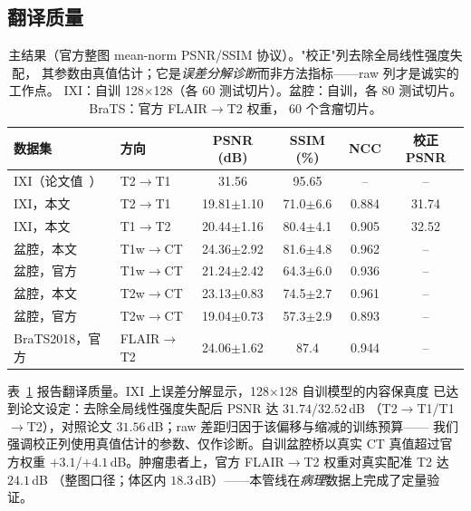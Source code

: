\documentclass[11pt]{article}
\begin{document}
\subsection{翻译质量}
\begin{table}[t]
\centering\small
\caption{主结果（官方整图 mean-norm PSNR/SSIM 协议）。"校正"列去除全局线性强度失配，
其参数由真值估计；它是\emph{误差分解诊断}而非方法指标——raw 列才是诚实的工作点。
IXI：自训 128$\times$128（各 60 测试切片）。盆腔：自训，各 80 测试切片。BraTS：官方 FLAIR$\to$T2 权重，
60 个含瘤切片。}
\label{tab:main}
\begin{tabular}{llcccc}
\toprule
数据集 & 方向 & PSNR (dB) & SSIM (\%) & NCC & 校正 PSNR \\
\midrule
IXI（论文值~\cite{arslan2025selfrdb}） & T2$\to$T1 & 31.56 & 95.65 & -- & -- \\
IXI，本文 & T2$\to$T1 & 19.81$\pm$1.10 & 71.0$\pm$6.6 & 0.884 & 31.74 \\
IXI，本文 & T1$\to$T2 & 20.44$\pm$1.16 & 80.4$\pm$4.1 & 0.905 & 32.52 \\
盆腔，本文 & T1w$\to$CT & 24.36$\pm$2.92 & 81.6$\pm$4.8 & 0.962 & -- \\
盆腔，官方 & T1w$\to$CT & 21.24$\pm$2.42 & 64.3$\pm$6.0 & 0.936 & -- \\
盆腔，本文 & T2w$\to$CT & 23.13$\pm$0.83 & 74.5$\pm$2.7 & 0.961 & -- \\
盆腔，官方 & T2w$\to$CT & 19.04$\pm$0.73 & 57.3$\pm$2.9 & 0.893 & -- \\
BraTS2018，官方 & FLAIR$\to$T2 & 24.06$\pm$1.62 & 87.4 & 0.944 & -- \\
\bottomrule
\end{tabular}
\end{table}

表~\ref{tab:main} 报告翻译质量。IXI 上误差分解显示，128$\times$128 自训模型的内容保真度
已达到论文设定：去除全局线性强度失配后 PSNR 达 $31.74$/$32.52$\,dB
（T2$\to$T1/T1$\to$T2），对照论文 $31.56$\,dB；raw 差距归因于该偏移与缩减的训练预算——
我们强调校正列使用真值估计的参数、仅作诊断。自训盆腔桥以真实 CT 真值超过官方权重
$+3.1$/$+4.1$\,dB。肿瘤患者上，官方 FLAIR$\to$T2 权重对真实配准 T2 达 $24.1$\,dB
（整图口径；体区内 $18.3$\,dB）——本管线在\emph{病理}数据上完成了定量验证。
\end{document}
